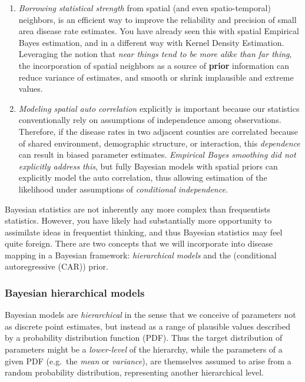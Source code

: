 \documentclass[
]{book}
\providecommand{\tightlist}{%
  \setlength{\itemsep}{0pt}\setlength{\parskip}{0pt}}
\begin{document}
\begin{enumerate}
\def\labelenumi{\arabic{enumi}.}
\tightlist
\item
  \emph{Borrowing statistical strength} from spatial (and even spatio-temporal) neighbors, is an efficient way to improve the reliability and precision of small area disease rate estimates. You have already seen this with spatial Empirical Bayes estimation, and in a different way with Kernel Density Estimation. Leveraging the notion that \emph{near things tend to be more alike than far thing}, the incorporation of spatial neighbors as a source of \textbf{prior} information can reduce variance of estimates, and smooth or shrink implausible and extreme values.
\item
  \emph{Modeling spatial auto correlation} explicitly is important because our statistics conventionally rely on assumptions of independence among observations. Therefore, if the disease rates in two adjacent counties are correlated because of shared environment, demographic structure, or interaction, this \emph{dependence} can result in biased parameter estimates. \emph{Empirical Bayes smoothing did not explicitly address this}, but fully Bayesian models with spatial priors can explicitly model the auto correlation, thus allowing estimation of the likelihood under assumptions of \emph{conditional independence}.
\end{enumerate}

Bayesian statistics are not inherently any more complex than frequentists statistics. However, you have likely had substantially more opportunity to assimilate ideas in frequentist thinking, and thus Bayesian statistics may feel quite foreign. There are two concepts that we will incorporate into disease mapping in a Bayesian framework: \emph{hierarchical models} and the (conditional autoregressive (CAR)) prior.

\hypertarget{bayesian-hierarchical-models}{%
\subsubsection{Bayesian hierarchical models}\label{bayesian-hierarchical-models}}

Bayesian models are \emph{hierarchical} in the sense that we conceive of parameters not as discrete point estimates, but instead as a range of plausible values described by a probability distribution function (PDF). Thus the target distribution of parameters might be a \emph{lower-level} of the hierarchy, while the parameters of a given PDF (e.g.~the \emph{mean} or \emph{variance}), are themselves assumed to arise from a random probability distribution, representing another hierarchical level.
\end{document}

